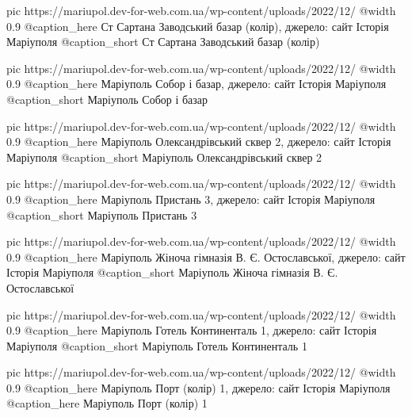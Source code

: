 	pic https://mariupol.dev-for-web.com.ua/wp-content/uploads/2022/12/%
	@width 0.9
	@caption_here Ст Сартана Заводський базар (колір), джерело: сайт Історія Маріуполя
	@caption_short Ст Сартана Заводський базар (колір)

	pic https://mariupol.dev-for-web.com.ua/wp-content/uploads/2022/12/%
	@width 0.9
	@caption_here Маріуполь Собор і базар, джерело: сайт Історія Маріуполя
	@caption_short Маріуполь Собор і базар

	pic https://mariupol.dev-for-web.com.ua/wp-content/uploads/2022/12/%
	@width 0.9
	@caption_here Маріуполь Олександрівський сквер 2, джерело: сайт Історія Маріуполя
	@caption_short Маріуполь Олександрівський сквер 2

	pic https://mariupol.dev-for-web.com.ua/wp-content/uploads/2022/12/%
	@width 0.9
	@caption_here Маріуполь Пристань 3, джерело: сайт Історія Маріуполя
	@caption_short Маріуполь Пристань 3

	pic https://mariupol.dev-for-web.com.ua/wp-content/uploads/2022/12/%
	@width 0.9
	@caption_here Маріуполь Жіноча гімназія В. Є. Остославської, джерело: сайт Історія Маріуполя
	@caption_short Маріуполь Жіноча гімназія В. Є. Остославської

	pic https://mariupol.dev-for-web.com.ua/wp-content/uploads/2022/12/%
	@width 0.9
	@caption_here Маріуполь Готель Континенталь 1, джерело: сайт Історія Маріуполя
	@caption_short Маріуполь Готель Континенталь 1

	pic https://mariupol.dev-for-web.com.ua/wp-content/uploads/2022/12/%
	@width 0.9
	@caption_here Маріуполь Порт (колір) 1, джерело: сайт Історія Маріуполя
	@caption_here Маріуполь Порт (колір) 1

